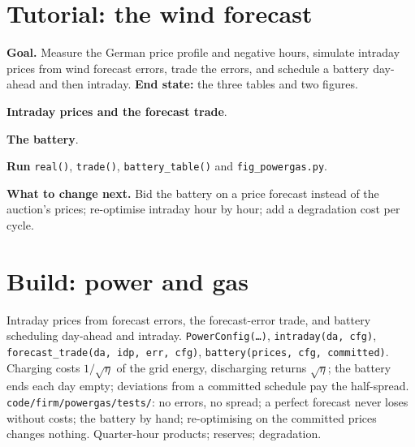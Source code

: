 \section{Tutorial: the wind forecast}\label{tut:s2:power-and-gas-trading:tut}

\begin{tutorial}
\textbf{Goal.} Measure the German price profile and negative hours, simulate intraday prices from wind forecast errors, trade the errors, and schedule a
battery day-ahead and then intraday. \textbf{End state:} the three tables and two figures.
\begin{tutsteps}
\item \textbf{Intraday prices and the forecast trade}.
\label{lst:s2:power-and-gas-trading:trade}
\item \textbf{The battery}.
\label{lst:s2:power-and-gas-trading:battery}
\item \textbf{Run} \texttt{real()}, \texttt{trade()}, \texttt{battery\_table()} and \texttt{fig\_powergas.py}.
\end{tutsteps}
\textbf{What to change next.} Bid the battery on a price forecast instead of the auction's prices; re-optimise intraday hour by hour; add a degradation
cost per cycle.
\end{tutorial}

\section{Build: power and gas}\label{bld:s2:power-and-gas-trading:powergas}

\begin{build}
 Intraday prices from forecast errors, the forecast-error trade, and battery scheduling day-ahead and intraday.
 \texttt{PowerConfig(\dots)}, \texttt{intraday(da, cfg)}, \texttt{forecast\_trade(da, idp, err, cfg)}, \texttt{battery(prices,
cfg, committed)}.
 Charging costs $1/\sqrt{\eta}$ of the grid energy, discharging returns $\sqrt{\eta}$; the battery ends each day empty; deviations
from a committed schedule pay the half-spread.
 \texttt{code/firm/powergas/tests/}: no errors, no spread; a perfect forecast never loses without costs; the battery by hand;
re-optimising on the committed prices changes nothing.
 Quarter-hour products; reserves; degradation.
\end{build}


